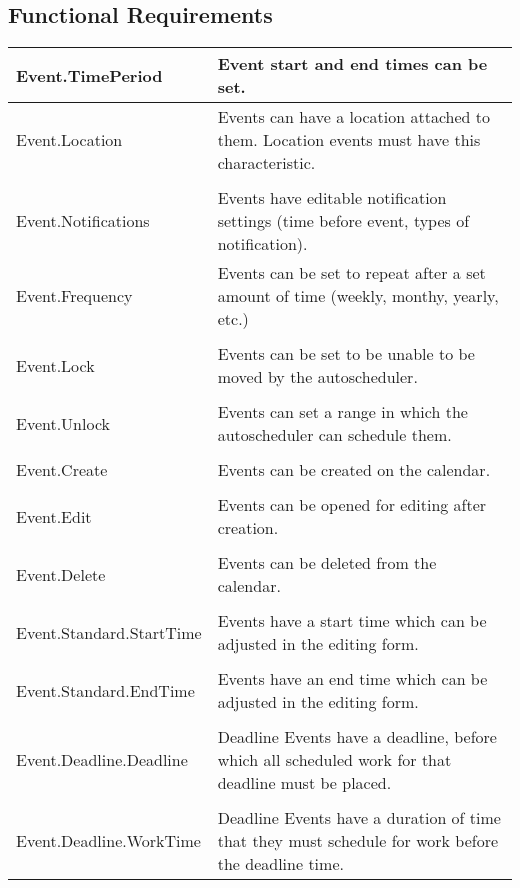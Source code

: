 \documentclass{scrreprt}
\begin{document}
\subsection{Functional Requirements}
\begin{center}
\begin{longtable}{ | p{6cm} | p{9cm} | }
\hline
Event.TimePeriod & Event start and end times can be set. \\
\hline
Event.Location & Events can have a location attached to them. Location events must have this characteristic. \\
& \\
Event.Notifications & Events have editable notification settings (time before event, types of notification).\\
\hline
Event.Frequency & Events can be set to repeat after a set amount of time (weekly, monthy, yearly, etc.) \\
& \\
Event.Lock & Events can be set to be unable to be moved by the autoscheduler. \\
& \\
Event.Unlock & Events can set a range in which the autoscheduler can schedule them.\\
& \\
Event.Create & Events can be created on the calendar. \\
& \\
Event.Edit & Events can be opened for editing after creation. \\
& \\
Event.Delete & Events can be deleted from the calendar. \\
& \\
Event.Standard.StartTime & Events have a start time which can be adjusted in the editing form. \\
& \\
Event.Standard.EndTime & Events have an end time which can be adjusted in the editing form. \\
& \\
Event.Deadline.Deadline & Deadline Events have a deadline, before which all scheduled work for that deadline must be placed. \\
& \\
Event.Deadline.WorkTime & Deadline Events have a duration of time that they must schedule for work before the deadline time. \\

\hline
\end{longtable}
\end{center}
\end{document}
